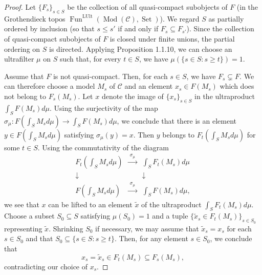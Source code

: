 \documentclass[11pt]{article}
\theoremstyle{plain}
\theoremstyle{remark}
\newcommand{\Mod}{\operatorname{Mod}}
\newcommand{\Set}{\operatorname{Set}}
\newcommand{\Fun}{\operatorname{Fun}}
\newcommand{\LUlt}{\mathrm{LUlt}}
\begin{document}
\begin{proof}
Let $\{F_s\}_{s \in S}$ be the collection of all quasi-compact subobjects of $F$ (in the
Grothendieck topos $\Fun^{\LUlt}(\Mod(\mathcal{C}), \Set)$). We regard $S$ as partially
ordered by inclusion (so that $s \leq s'$ if and only if $F_s \subseteq F_{s'}$). Since the
collection of quasi-compact subobjects of $F$ is closed under finite unions, the partial
ordering on $S$ is directed. Applying Proposition 1.1.10, we can choose an ultrafilter
$\mu$ on $S$ such that, for every $t \in S$, we have $\mu(\{s \in S : s \geq t\}) = 1$.

Assume that $F$ is not quasi-compact. Then, for each $s \in S$, we have
$F_s \subsetneq F$. We can therefore choose a model $M_s$ of $\mathcal{C}$ and an element
$x_s \in F(M_s)$ which does not belong to $F_s(M_s)$. Let $x$ denote the image of
$\{x_s\}_{s \in S}$ in the ultraproduct $\int_S F(M_s)d\mu$. Using the surjectivity of the
map $\sigma_\mu : F(\int_S M_s d\mu) \to \int_S F(M_s)d\mu$, we conclude that there is an
element $y \in F(\int_S M_s d\mu)$ satisfying $\sigma_\mu(y) = x$. Then $y$ belongs to
$F_t(\int_S M_s d\mu)$ for some $t \in S$. Using the commutativity of the diagram
\[
\begin{array}{ccc}
F_t(\int_S M_s d\mu) & \xrightarrow{\ \sigma_\mu\ } & \int_S F_t(M_s)d\mu \\[2.2ex]
\downarrow & & \downarrow \\[2.2ex]
F(\int_S M_s d\mu) & \xrightarrow{\ \sigma_\mu\ } & \int_S F(M_s)d\mu,
\end{array}
\]
we see that $x$ can be lifted to an element $\widetilde{x}$ of the ultraproduct
$\int_S F_t(M_s)d\mu$. Choose a subset $S_0 \subseteq S$ satisfying $\mu(S_0) = 1$ and a
tuple $\{\widetilde{x}_s \in F_t(M_s)\}_{s \in S_0}$ representing $\widetilde{x}$. Shrinking
$S_0$ if necessary, we may assume that $\widetilde{x}_s = x_s$ for each $s \in S_0$ and that
$S_0 \subseteq \{s \in S : s \geq t\}$. Then, for any element $s \in S_0$, we conclude that
\[
x_s = \widetilde{x}_s \in F_t(M_s) \subseteq F_s(M_s),
\]
contradicting our choice of $x_s$.
\end{proof}

\end{document}

